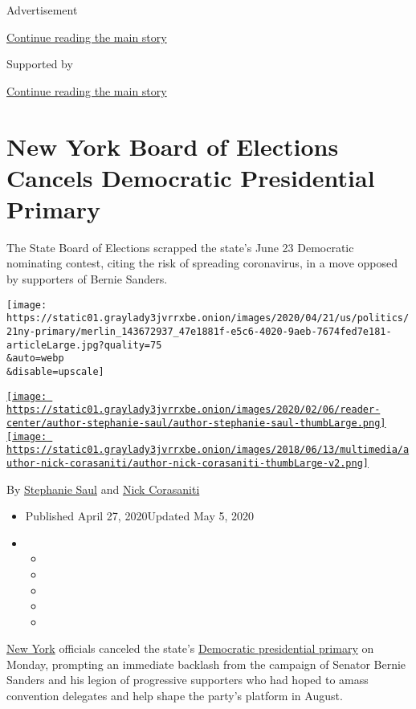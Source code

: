 Advertisement

\protect\hyperlink{after-top}{Continue reading the main story}

Supported by

\protect\hyperlink{after-sponsor}{Continue reading the main story}

\hypertarget{new-york-board-of-elections-cancels-democratic-presidential-primary}{%
\section{New York Board of Elections Cancels Democratic Presidential
Primary}\label{new-york-board-of-elections-cancels-democratic-presidential-primary}}

The State Board of Elections scrapped the state's June 23 Democratic
nominating contest, citing the risk of spreading coronavirus, in a move
opposed by supporters of Bernie Sanders.

\texttt{[image: https://static01.graylady3jvrrxbe.onion/images/2020/04/21/us/politics/21ny-primary/merlin\_143672937\_47e1881f-e5c6-4020-9aeb-7674fed7e181-articleLarge.jpg?quality=75\\\&auto=webp\\\&disable=upscale]}

\href{https://www.nytimes3xbfgragh.onion/by/stephanie-saul}{\texttt{[image: https://static01.graylady3jvrrxbe.onion/images/2020/02/06/reader-center/author-stephanie-saul/author-stephanie-saul-thumbLarge.png]}}\href{https://www.nytimes3xbfgragh.onion/by/nick-corasaniti}{\texttt{[image: https://static01.graylady3jvrrxbe.onion/images/2018/06/13/multimedia/author-nick-corasaniti/author-nick-corasaniti-thumbLarge-v2.png]}}

By \href{https://www.nytimes3xbfgragh.onion/by/stephanie-saul}{Stephanie
Saul} and
\href{https://www.nytimes3xbfgragh.onion/by/nick-corasaniti}{Nick
Corasaniti}

\begin{itemize}
\item
  Published April 27, 2020Updated May 5, 2020
\item
  \begin{itemize}
  \item
  \item
  \item
  \item
  \item
  \end{itemize}
\end{itemize}

\href{https://www.nytimes3xbfgragh.onion/2020/05/05/us/politics/ny-presidential-primary.html}{New
York} officials canceled the state's
\href{https://www.nytimes3xbfgragh.onion/2020/06/22/nyregion/ny-primary-2020.html}{Democratic
presidential primary} on Monday, prompting an immediate backlash from
the campaign of Senator Bernie Sanders and his legion of progressive
supporters who had hoped to amass convention delegates and help shape
the party's platform in August.

